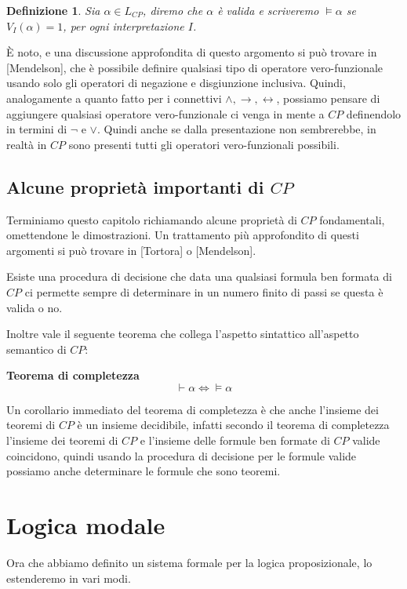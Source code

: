 \documentclass[a4paper, 12pt]{article}
\newtheorem{definition}{Definizione}
\begin{document}
\begin{definition}
Sia $\alpha \in L_{CP}$, diremo che $\alpha$ è valida e scriveremo $\vDash \alpha$ se
$V_I(\alpha) = 1$, per ogni interpretazione $I$.
\end{definition}

È noto, e una discussione approfondita di questo argomento si può trovare in [Mendelson],
che è possibile definire qualsiasi tipo di operatore vero-funzionale usando
solo gli operatori di negazione e disgiunzione inclusiva.
Quindi, analogamente a quanto fatto per i connettivi $\land, \rightarrow, \leftrightarrow$,
possiamo pensare di aggiungere qualsiasi operatore vero-funzionale ci venga in mente
a $CP$ definendolo in termini di $\neg$ e $\lor$.
Quindi anche se dalla presentazione non sembrerebbe, in realtà in $CP$ sono presenti
tutti gli operatori vero-funzionali possibili.

\subsection{Alcune proprietà importanti di $CP$}

Terminiamo questo capitolo richiamando alcune proprietà di $CP$ fondamentali, omettendone
le dimostrazioni. Un trattamento più approfondito di questi argomenti si può trovare in
[Tortora] o [Mendelson].

Esiste una procedura di decisione che data una qualsiasi formula ben formata di $CP$
ci permette sempre di determinare in un numero finito di passi se questa è valida o no.

Inoltre vale il seguente teorema che collega l'aspetto sintattico all'aspetto semantico
di $CP$:

\begin{flushleft}
\textbf{Teorema di completezza}
$$\vdash \alpha \Leftrightarrow \vDash \alpha$$
\end{flushleft}

Un corollario immediato del teorema di completezza è che anche l'insieme dei teoremi
di $CP$ è un insieme decidibile, infatti secondo il teorema di completezza
l'insieme dei teoremi di $CP$ e l'insieme delle formule ben formate di $CP$ valide
coincidono, quindi usando la procedura di decisione per le formule valide
possiamo anche determinare le formule che sono teoremi.

\section{Logica modale}
Ora che abbiamo definito un sistema formale per la logica proposizionale,
lo estenderemo in vari modi.
\end{document}

